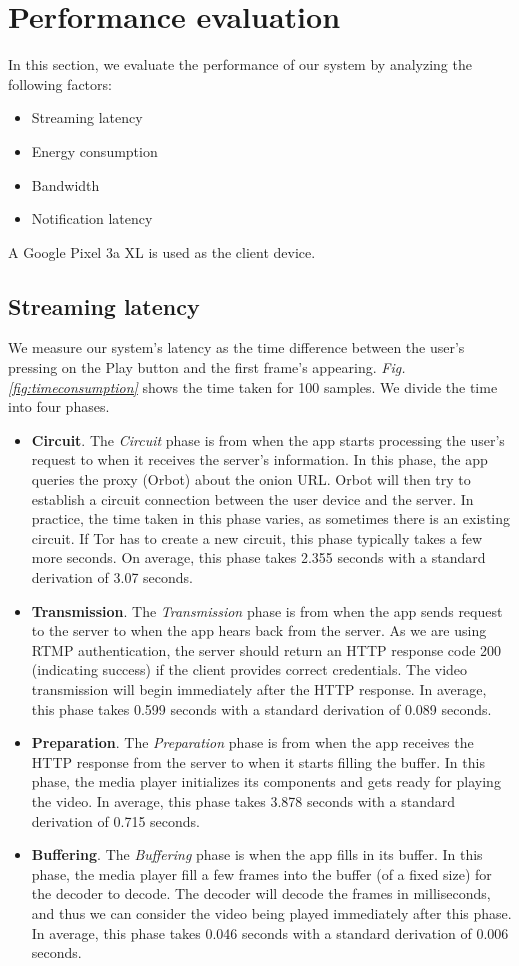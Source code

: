 \section{Performance evaluation}
In this section, we evaluate the performance of our system by analyzing the following factors:
\begin{itemize}
	\item Streaming latency
	\item Energy consumption
	\item Bandwidth
	\item Notification latency
\end{itemize}

A Google Pixel 3a XL is used as the client device.

\subsection{Streaming latency}
\label{subsec:streaming_latency}
We measure our system's latency as the time difference between the user’s pressing on the Play button and the first frame’s appearing. \textit{Fig. \ref{fig:timeconsumption}} shows the time taken for 100 samples. We divide the time into four phases.
\begin{itemize}
	\item \textbf{Circuit}. The \textit{Circuit} phase is from when the app starts processing the user’s request to when it receives the server's information. In this phase, the app queries the proxy (Orbot) about the onion URL. Orbot will then try to establish a circuit connection between the user device and the server. In practice, the time taken in this phase varies, as sometimes there is an existing circuit. If Tor has to create a new circuit, this phase typically takes a few more seconds. On average, this phase takes 2.355 seconds with a standard derivation of 3.07 seconds.
	\item \textbf{Transmission}. The \textit{Transmission} phase is from when the app sends request to the server to when the app hears back from the server. As we are using RTMP authentication, the server should return an HTTP response code 200 (indicating success) if the client provides correct credentials. The video transmission will begin immediately after the HTTP response. In average, this phase takes 0.599 seconds with a standard derivation of 0.089 seconds.
	\item \textbf{Preparation}. The \textit{Preparation} phase is from when the app receives the HTTP response from the server to when it starts filling the buffer. In this phase, the media player initializes its components and gets ready for playing the video. In average, this phase takes 3.878 seconds with a standard derivation of 0.715 seconds.
	\item \textbf{Buffering}. The \textit{Buffering} phase is when the app fills in its buffer. In this phase, the media player fill a few frames into the buffer (of a fixed size) for the decoder to decode. The decoder will decode the frames in milliseconds, and thus we can consider the video being played immediately after this phase. In average, this phase takes 0.046 seconds with a standard derivation of 0.006 seconds.
\end{itemize}

